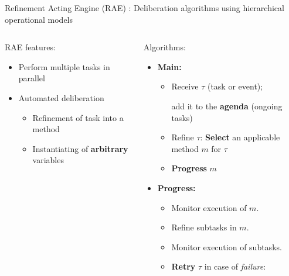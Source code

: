 \begin{frame}{Refinement Acting Engine (RAE)\cite{ghallabAutomatedPlanningActing2016} : Deliberation algorithms using hierarchical operational models}
\begin{columns}[T]
    \begin{column}{0.35\textwidth}
    \pause
    \setlength{\leftmargini}{-1pt}
    RAE features:
    \small
    \begin{itemize}
        \item Perform multiple tasks in parallel
        \pause
        \item Automated deliberation
        \begin{itemize}
            \setlength{\leftmargini}{-1pt}
            \pause
            \item Refinement of task into a method
            \pause
            \item Instantiating of \textbf{arbitrary} variables
        \end{itemize}
    \end{itemize}
    \end{column}
    \begin{column}{0.65\textwidth}
        
        \pause
        Algorithms:
        \small
        \pause
        \begin{itemize}
            \setlength{\leftmargini}{-1pt}
            \item \textbf{Main:} 
            \begin{itemize}
                \item Receive $\tau$ (task or event);
                
                add it to the \textbf{agenda} (ongoing tasks)
                \pause
                \item Refine $\tau$: \textbf{Select} an applicable method $m$ for $\tau$
                \pause
                \item \textbf{Progress} $m$
            \end{itemize}
            \pause
            \item \textbf{Progress:}
                \begin{itemize}
                \pause
                    \item Monitor execution of $m$.
                \pause
                    \item Refine subtasks in $m$.    
                \pause
                    \item Monitor execution of subtasks.
                \pause
                    \item \textbf{Retry} $\tau$ in case of \emph{failure}:
                

\end{itemize}
\end{itemize}
\end{column}
\end{columns}
\end{frame}
